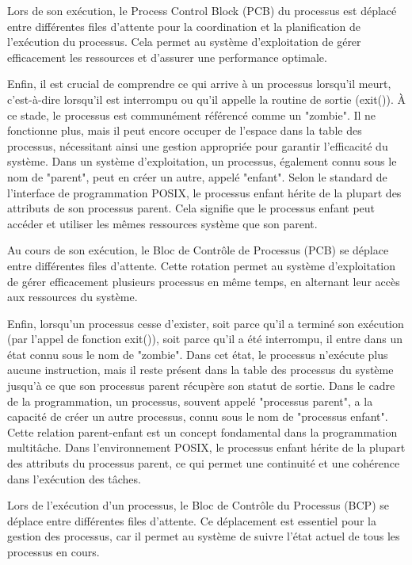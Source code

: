 \documentclass[12pt]{article}
\begin{document}
Lors de son exécution, le Process Control Block (PCB) du processus est déplacé entre différentes files d'attente pour la coordination et la planification de l'exécution du processus. Cela permet au système d'exploitation de gérer efficacement les ressources et d'assurer une performance optimale.

Enfin, il est crucial de comprendre ce qui arrive à un processus lorsqu'il meurt, c'est-à-dire lorsqu'il est interrompu ou qu'il appelle la routine de sortie (exit()). À ce stade, le processus est communément référencé comme un "zombie". Il ne fonctionne plus, mais il peut encore occuper de l'espace dans la table des processus, nécessitant ainsi une gestion appropriée pour garantir l'efficacité du système.
Dans un système d'exploitation, un processus, également connu sous le nom de "parent", peut en créer un autre, appelé "enfant". Selon le standard de l'interface de programmation POSIX, le processus enfant hérite de la plupart des attributs de son processus parent. Cela signifie que le processus enfant peut accéder et utiliser les mêmes ressources système que son parent.

Au cours de son exécution, le Bloc de Contrôle de Processus (PCB) se déplace entre différentes files d'attente. Cette rotation permet au système d'exploitation de gérer efficacement plusieurs processus en même temps, en alternant leur accès aux ressources du système.

Enfin, lorsqu'un processus cesse d'exister, soit parce qu'il a terminé son exécution (par l'appel de fonction exit()), soit parce qu'il a été interrompu, il entre dans un état connu sous le nom de "zombie". Dans cet état, le processus n'exécute plus aucune instruction, mais il reste présent dans la table des processus du système jusqu'à ce que son processus parent récupère son statut de sortie.
Dans le cadre de la programmation, un processus, souvent appelé "processus parent", a la capacité de créer un autre processus, connu sous le nom de "processus enfant". Cette relation parent-enfant est un concept fondamental dans la programmation multitâche. Dans l'environnement POSIX, le processus enfant hérite de la plupart des attributs du processus parent, ce qui permet une continuité et une cohérence dans l'exécution des tâches.

Lors de l'exécution d'un processus, le Bloc de Contrôle du Processus (BCP) se déplace entre différentes files d'attente. Ce déplacement est essentiel pour la gestion des processus, car il permet au système de suivre l'état actuel de tous les processus en cours.
\end{document}
